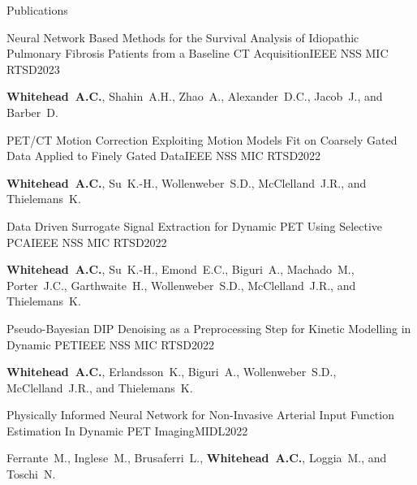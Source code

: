 \documentclass{cv}
\begin{document}
\begin{spacing}{1.0}
\begin{rSection}{Publications}
            \item \begin{rSubsection}{Neural Network Based Methods for the Survival Analysis of Idiopathic Pulmonary Fibrosis Patients from a Baseline CT Acquisition}{}{IEEE NSS MIC RTSD}{2023}
                \item \textbf{Whitehead~A.C.}, Shahin~A.H., Zhao~A., Alexander~D.C., Jacob~J., and Barber~D.
            \end{rSubsection}
            
            \item \begin{rSubsection}{PET/CT Motion Correction Exploiting Motion Models Fit on Coarsely Gated Data Applied to Finely Gated Data}{}{IEEE NSS MIC RTSD}{2022}
                \item \textbf{Whitehead~A.C.}, Su~K.-H., Wollenweber~S.D., McClelland~J.R., and Thielemans~K.
            \end{rSubsection}
            
            \item \begin{rSubsection}{Data Driven Surrogate Signal Extraction for Dynamic PET Using Selective PCA}{}{IEEE NSS MIC RTSD}{2022}
                \item \textbf{Whitehead~A.C.}, Su~K.-H., Emond~E.C., Biguri~A., Machado~M., Porter~J.C., Garthwaite~H., Wollenweber~S.D., McClelland~J.R., and Thielemans~K.
            \end{rSubsection}
            
            \item \begin{rSubsection}{Pseudo-Bayesian DIP Denoising as a Preprocessing Step for Kinetic Modelling in Dynamic \newline PET}{}{IEEE NSS MIC RTSD}{2022}
                \item \textbf{Whitehead~A.C.}, Erlandsson~K., Biguri~A., Wollenweber~S.D., McClelland~J.R., and Thielemans~K.
            \end{rSubsection}
            
            \item \begin{rSubsection}{Physically Informed Neural Network for Non-Invasive Arterial Input Function Estimation In Dynamic PET Imaging}{}{MIDL}{2022}
                \item Ferrante~M., Inglese~M., Brusaferri~L., \textbf{Whitehead~A.C.}, Loggia~M., and Toschi~N.
            \end{rSubsection}
            

\end{rSection}
\end{spacing}
\end{document}
